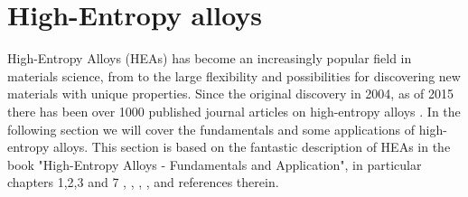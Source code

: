 \chapter{High-Entropy alloys}
\label{sec:HEA}

High-Entropy Alloys (HEAs) has become an increasingly popular field in materials science, from to the large flexibility and possibilities for discovering new materials with unique properties. Since the original discovery in 2004, as of 2015 there has been over 1000 published journal articles on high-entropy alloys \cite{hea2016_ch1}. In the following section we will cover the fundamentals and some applications of high-entropy alloys. This section is based on the fantastic description of HEAs in the book "High-Entropy Alloys - Fundamentals and Application", in particular chapters 1,2,3 and 7 \cite{hea2016_ch1}, \cite{hea2016_ch2}, \cite{hea2016_ch3}, \cite{hea2016_ch7}, and references therein.

